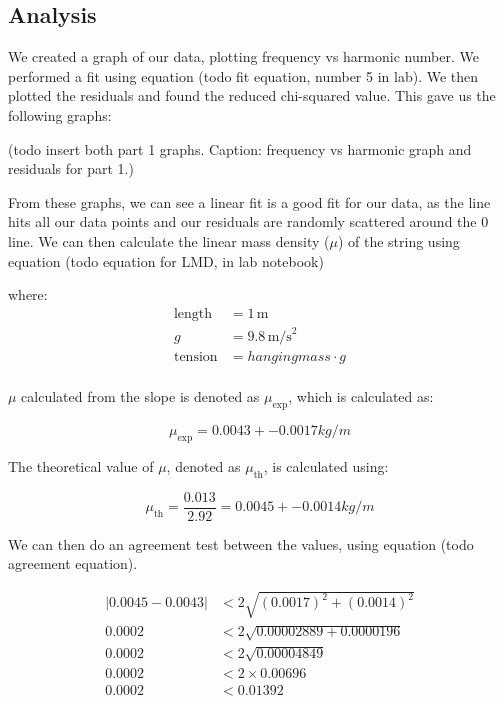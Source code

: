 \documentclass[11pt]{article}
\begin{document}
    \subsection{Analysis}\label{subsec:part_1_analysis}
    We created a graph of our data, plotting frequency vs harmonic number. We performed a fit using equation (todo fit equation, number 5 in lab). We then plotted the residuals and found the reduced chi-squared value. This gave us the following graphs:

    (todo insert both part 1 graphs. Caption: frequency vs harmonic graph and residuals for part 1.)

    From these graphs, we can see a linear fit is a good fit for our data, as the line hits all our data points and our residuals are randomly scattered around the 0 line. We can then calculate the linear mass density ($\mu$) of the string using equation (todo equation for LMD, in lab notebook)
    
    where:
    \begin{align*}
    \text{length} &= 1 \, \text{m} \\
    g &= 9.8 \, \text{m/s}^2 \\
    \text{tension} &= hanging mass \cdot g\\
    \end{align*}
    
    $\mu$ calculated from the slope is denoted as $\mu_{\text{exp}}$, which is calculated as:
    
    \begin{equation}
    \mu_{\text{exp}} = 0.0043 +- 0.0017 kg/m
    \end{equation}
    
    The theoretical value of $\mu$, denoted as $\mu_{\text{th}}$, is calculated using:
    
    \begin{equation}
    \mu_{\text{th}} = \frac{0.013}{2.92} = 0.0045 +- 0.0014 kg/m
    \end{equation}

    We can then do an agreement test between the values, using equation (todo agreement equation).

    \begin{align*}
    |0.0045 - 0.0043| &< 2 \sqrt{(0.0017)^2 + (0.0014)^2} \\
    0.0002 &< 2 \sqrt{0.00002889 + 0.0000196} \\
    0.0002 &< 2 \sqrt{0.00004849} \\
    0.0002 &< 2 \times 0.00696 \\
    0.0002 &< 0.01392
    \end{align*}
\end{document}
